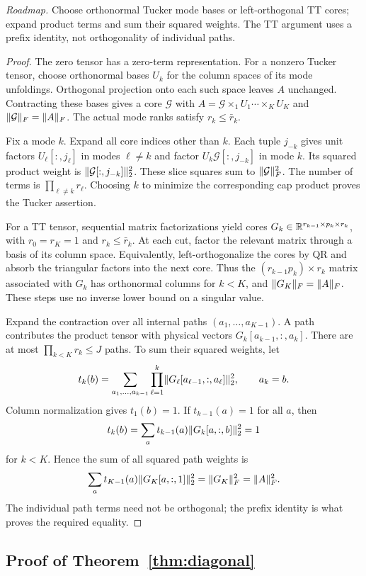 \noindent\emph{Roadmap.} Choose orthonormal Tucker mode bases or left-orthogonal TT cores; expand product terms and sum their squared weights. The TT argument uses a prefix identity, not orthogonality of individual paths.
\begin{proof}
The zero tensor has a zero-term representation. For a nonzero Tucker tensor, choose orthonormal bases $U_k$ for the column spaces of its mode unfoldings. Orthogonal projection onto each such space leaves $A$ unchanged. Contracting these bases gives a core $\mathcal G$ with $A=\mathcal G\times_1U_1\cdots\times_KU_K$ and $\lVert \mathcal G\rVert_F=\lVert A\rVert_F$. The actual mode ranks satisfy $r_k\le\bar r_k$.

Fix a mode $k$. Expand all core indices other than $k$. Each tuple $j_{-k}$ gives unit factors $U_\ell[:,j_\ell]$ in modes $\ell\ne k$ and factor $U_k\mathcal G[:,j_{-k}]$ in mode $k$. Its squared product weight is $\lVert \mathcal G[:,j_{-k}]\rVert_2^2$. These slice squares sum to $\lVert \mathcal G\rVert_F^2$. The number of terms is $\prod_{\ell\ne k}r_\ell$. Choosing $k$ to minimize the corresponding cap product proves the Tucker assertion.

For a TT tensor, sequential matrix factorizations yield cores $G_k\in\mathbb R^{r_{k-1}\times p_k\times r_k}$, with $r_0=r_K=1$ and $r_k\le\bar r_k$. At each cut, factor the relevant matrix through a basis of its column space. Equivalently, left-orthogonalize the cores by QR and absorb the triangular factors into the next core. Thus the $(r_{k-1}p_k)\times r_k$ matrix associated with $G_k$ has orthonormal columns for $k<K$, and $\lVert G_K\rVert_F=\lVert A\rVert_F$. These steps use no inverse lower bound on a singular value.

Expand the contraction over all internal paths $(a_1,\ldots,a_{K-1})$. A path contributes the product tensor with physical vectors $G_k[a_{k-1},:,a_k]$. There are at most $\prod_{k<K}r_k\le J$ paths. To sum their squared weights, let
\[
 t_k(b)=\sum_{a_1,\ldots,a_{k-1}}
 \prod_{\ell=1}^k\lVert G_\ell[a_{\ell-1},:,a_\ell]\rVert_2^2,
 \qquad a_k=b.
\]
Column normalization gives $t_1(b)=1$. If $t_{k-1}(a)=1$ for all $a$, then
\[
 t_k(b)=\sum_a t_{k-1}(a)\lVert G_k[a,:,b]\rVert_2^2=1
\]
for $k<K$. Hence the sum of all squared path weights is
\[
 \sum_a t_{K-1}(a)\lVert G_K[a,:,1]\rVert_2^2=\lVert G_K\rVert_F^2=\lVert A\rVert_F^2.
\]
The individual path terms need not be orthogonal; the prefix identity is what proves the required equality.
\end{proof}

\subsection{Proof of Theorem~\ref{thm:diagonal}}


